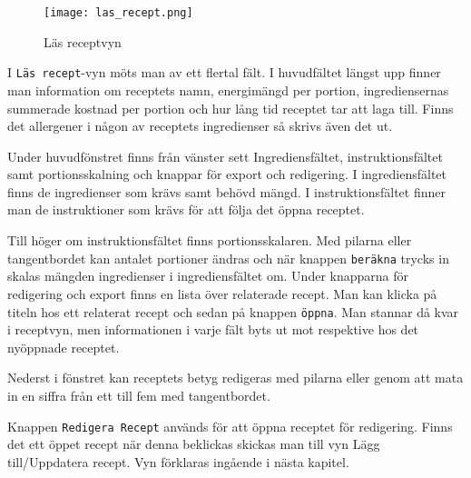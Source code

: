 \begin{figure}[H]
        \centering 
        \texttt{[image: las\_recept.png]} 
        \caption{Läs receptvyn} 
        \label{fig:receptvyn}
\end{figure}

I \verb+Läs recept+-vyn möts man av ett flertal fält. I huvudfältet längst upp finner
man information om receptets namn, energimängd per portion,
ingrediensernas summerade kostnad per portion och hur lång tid receptet tar att laga till. Finns det allergener i någon av receptets ingredienser så skrivs även det ut.

Under huvudfönstret finns från vänster sett Ingrediensfältet,
instruktionsfältet samt portionsskalning och knappar för export
och redigering. I ingrediensfältet finns de ingredienser som krävs
samt behövd mängd. I instruktionsfältet finner man de instruktioner som krävs för att följa det öppna receptet. 

Till höger om instruktionsfältet finns portionsskalaren. Med pilarna eller tangentbordet kan antalet portioner ändras och när knappen \verb+beräkna+ trycks in
skalas mängden ingredienser i ingrediensfältet om. Under knapparna för redigering och export finns en
lista över relaterade recept. Man kan klicka på titeln hos ett relaterat recept och sedan på knappen \verb+öppna+. Man stannar då kvar i receptvyn, men informationen i varje fält byts ut mot respektive hos det nyöppnade receptet. 

Nederst i fönstret kan receptets betyg redigeras med pilarna eller genom att mata in en siffra från ett till fem med tangentbordet.

Knappen \verb+Redigera Recept+ används för att öppna receptet för redigering. Finns det ett öppet recept när denna beklickas skickas man till vyn Lägg till/Uppdatera recept. Vyn förklaras ingående i nästa kapitel.
